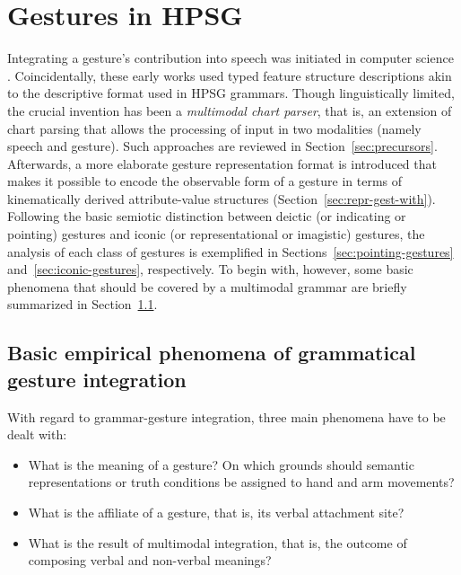 \documentclass[output=paper
 	        ,biblatex
                ,babelshorthands
                ,newtxmath
                ,draftmode
                ,colorlinks, citecolor=brown
]{langscibook}
\begin{document}
\section{Gestures in HPSG}
\label{sec:gestures-hpsg}

Integrating a gesture's contribution into speech was initiated in computer science \citep{Bolt:1980}.
%
Coincidentally, these early works used typed feature structure descriptions akin to the descriptive format used in HPSG grammars.
%
Though linguistically limited, the crucial invention has been a \emph{multimodal chart parser}, that is, an extension of chart parsing that allows the processing of input in two modalities (namely speech and gesture).
%
Such approaches are reviewed in Section~\ref{sec:precursors}.
%
Afterwards, a more elaborate gesture representation format is introduced that makes it possible to encode the observable form of a gesture in terms of kinematically derived attribute-value structures (Section~\ref{sec:repr-gest-with}).
%
Following the basic semiotic distinction between deictic (or indicating or pointing) gestures and iconic (or representational or imagistic) gestures, the analysis of each class of gestures is exemplified in Sections~\ref{sec:pointing-gestures} and~\ref{sec:iconic-gestures}, respectively.
%
To begin with, however, some basic phenomena that should be covered by a multimodal grammar are briefly summarized in Section~\ref{sec:empir-desid-gramm}.



\subsection{Basic empirical phenomena of grammatical gesture integration}
\label{sec:empir-desid-gramm}

With regard to grammar-gesture integration, three main phenomena have to be dealt with:
%
\begin{itemize}
\item What is the meaning of a gesture? On which grounds should semantic representations or truth conditions be assigned to hand and arm movements?
\item What is the affiliate of a gesture, that is, its verbal attachment site?
\item What is the result of multimodal integration, that is, the outcome of composing verbal and non-verbal meanings?
\end{itemize}
\end{document}
